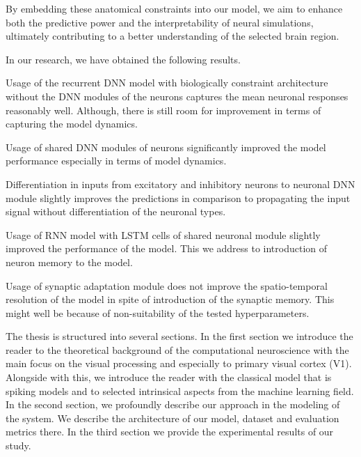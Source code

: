 By embedding these anatomical constraints into our model, we aim to
enhance both the predictive power and the interpretability of neural simulations,
ultimately contributing to a better understanding of the selected brain region.

In our research, we have obtained the following results. 
\begin{description}
    \item Usage of the recurrent DNN model with biologically constraint 
    architecture without the DNN modules of the neurons captures the 
    mean neuronal responses reasonably well. Although, there is still
    room for improvement in terms of capturing the model dynamics.
    \item Usage of shared DNN modules of neurons significantly improved the
    model performance especially in terms of model dynamics.
    \item Differentiation in inputs from excitatory and inhibitory
    neurons to neuronal DNN module slightly improves the predictions in
    comparison to propagating the input signal without differentiation
    of the neuronal types.
    \item Usage of RNN model with LSTM cells of shared neuronal module
    slightly improved the performance of the model. This we address to
    introduction of neuron memory to the model.
    \item Usage of synaptic adaptation module does not improve the
    spatio-temporal resolution of the model in spite of introduction of 
    the synaptic memory. This might well be because of non-suitability of
    the tested hyperparameters.
\end{description}

The thesis is structured into several sections. In the first section
we introduce the reader to the theoretical background of the computational
neuroscience with the main focus on the visual processing and especially
to primary visual cortex (V1). Alongside with this, we introduce the reader
with the classical model that is spiking models and to selected intrinsical
aspects from the machine learning field. In the second section, we profoundly
describe our approach in the modeling of the system. We describe the architecture
of our model, dataset and evaluation metrics there. In the third section
we provide the experimental results of our study.


